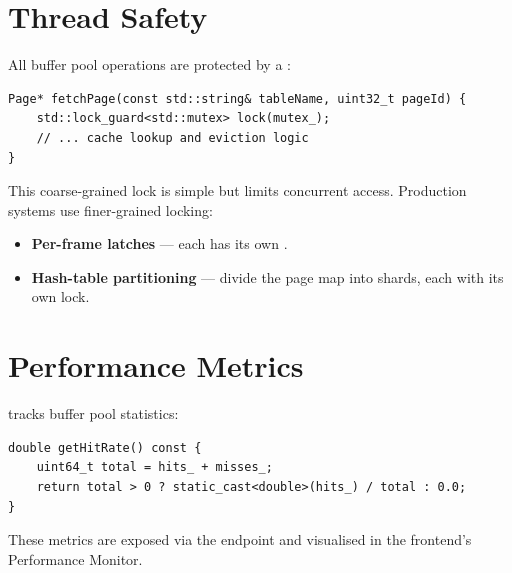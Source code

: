\section{Thread Safety}

All buffer pool operations are protected by a :
\begin{lstlisting}[style=cpp, caption={Mutex-protected fetchPage (excerpt).}]
Page* fetchPage(const std::string& tableName, uint32_t pageId) {
    std::lock_guard<std::mutex> lock(mutex_);
    // ... cache lookup and eviction logic
}
\end{lstlisting}

This coarse-grained lock is simple but limits concurrent access.  Production systems use finer-grained locking:
\begin{itemize}[nosep]
  \item \textbf{Per-frame latches} --- each  has its own .
  \item \textbf{Hash-table partitioning} --- divide the page map into shards, each with its own lock.
\end{itemize}

\section{Performance Metrics}

\shiftdb{} tracks buffer pool statistics:

\begin{lstlisting}[style=cpp, caption={Hit-rate calculation.}]
double getHitRate() const {
    uint64_t total = hits_ + misses_;
    return total > 0 ? static_cast<double>(hits_) / total : 0.0;
}
\end{lstlisting}

These metrics are exposed via the  endpoint and visualised in the frontend's Performance Monitor.

